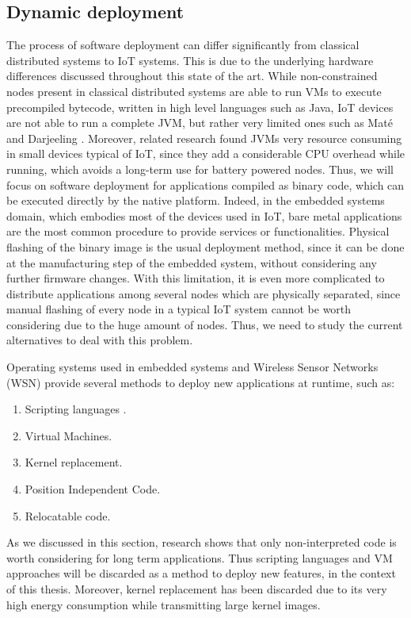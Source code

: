 \subsection{Dynamic deployment}
\label{sec:IoTDeployment}
The process of software deployment can differ significantly from classical distributed systems to IoT systems.
This is due to the underlying hardware differences discussed throughout this state of the art.
While non-constrained nodes present in classical distributed systems are able to run VMs to execute precompiled bytecode, written in high level languages such as Java, IoT devices are not able to run a complete JVM, but rather very limited ones such as Mat\'e  \cite{levis2002mate} and Darjeeling  \cite{brouwers2009darjeeling}.
Moreover, related research \cite{oliver2014reprogramming} found JVMs very resource consuming in small devices typical of IoT, since they add a considerable CPU overhead while running, which avoids a long-term use for battery powered nodes.
Thus, we will focus on software deployment for applications compiled as binary code, which can be executed directly by the native platform.
Indeed, in the embedded systems domain, which embodies most of the devices used in IoT, bare metal applications are the most common procedure to provide services or functionalities.
Physical flashing of the binary image is the usual deployment method, since it can be done at the manufacturing step of the embedded system, without considering any further firmware changes.
With this limitation, it is even more complicated to distribute applications among several nodes which are physically separated, since manual flashing of every node in a typical IoT system cannot be worth considering due to the huge amount of nodes.
Thus, we need to study the current alternatives to deal with this problem.

Operating systems used in embedded systems and Wireless Sensor Networks (WSN) provide several methods to deploy new applications at runtime, such as:
\begin{enumerate}
	\item Scripting languages  \cite{dunkels2006low} \cite{kovatsch2012actinium}.
	\item Virtual Machines.
	\item Kernel replacement.
	\item Position Independent Code.
	\item Relocatable code.
\end{enumerate}
As we discussed in this section, research shows that only non-interpreted code is worth considering for long term applications.
Thus scripting languages and VM approaches will be discarded as a method to deploy new features, in the context of this thesis.
Moreover, kernel replacement has been discarded due to its very high energy consumption while transmitting large kernel images.

